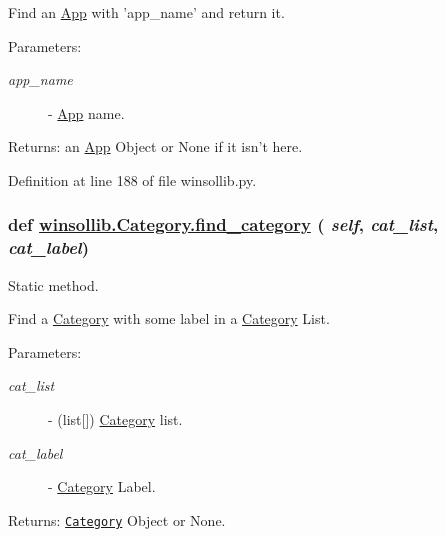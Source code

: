 Find an \hyperlink{classwinsollib_1_1App}{App} with 'app\_\-name' and return it. 

\begin{Desc}
\item[Parameters:]
\begin{description}
\item[{\em app\_\-name}]- \hyperlink{classwinsollib_1_1App}{App} name. \end{description}
\end{Desc}
\begin{Desc}
\item[Returns:]an \hyperlink{classwinsollib_1_1App}{App} Object or None if it isn't here. \end{Desc}


Definition at line 188 of file winsollib.py.\hypertarget{classwinsollib_1_1Category_6cd15f5bc301cd636af3a59b813f57cb}{
\subsubsection[find\_\-category]{\setlength{\rightskip}{0pt plus 5cm}def \hyperlink{classwinsollib_1_1Category_ced2fd769fd79d564f6b5fc588797d2d}{winsollib.Category.find\_\-category} ( {\em self},  {\em cat\_\-list},  {\em cat\_\-label})}}
\label{classwinsollib_1_1Category_6cd15f5bc301cd636af3a59b813f57cb}


Static method. 

Find a \hyperlink{classwinsollib_1_1Category}{Category} with some label in a \hyperlink{classwinsollib_1_1Category}{Category} List.

\begin{Desc}
\item[Parameters:]
\begin{description}
\item[{\em cat\_\-list}]- (list\mbox{[}\mbox{]}) \hyperlink{classwinsollib_1_1Category}{Category} list. \item[{\em cat\_\-label}]- \hyperlink{classwinsollib_1_1Category}{Category} Label. \end{description}
\end{Desc}
\begin{Desc}
\item[Returns:]{\tt \hyperlink{classwinsollib_1_1Category}{Category}} Object or None. \end{Desc}


